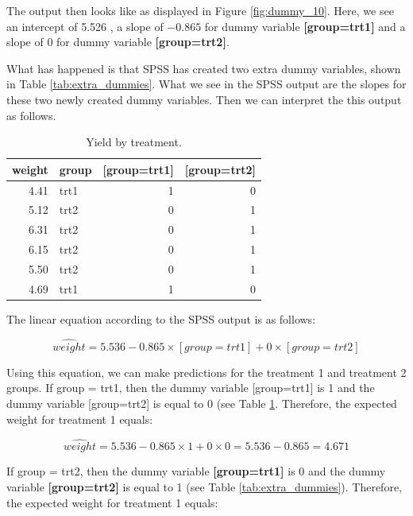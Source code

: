\documentclass[]{book}\usepackage[]{graphicx}\usepackage[]{color}
\begin{document}
The output then looks like as displayed in Figure \ref{fig:dummy_10}. Here, we see an intercept of 5.526 , a slope of $-0.865$ for dummy variable \textbf{[group=trt1]} and a slope of 0 for dummy variable \textbf{[group=trt2]}. 

What has happened is that SPSS has created two extra dummy variables, shown in Table \ref{tab:extra_dummies}. What we see in the SPSS output are the slopes for these two newly created dummy variables. Then we can interpret the this output as follows. 

\begin{table}[ht]
\centering
\caption{Yield by treatment.} 
\label{tab:dummy_9}
\begin{tabular}{rlrr}
  \hline
weight & group & [group=trt1] & [group=trt2] \\ 
  \hline
4.41 & trt1 & 1 & 0 \\ 
  5.12 & trt2 & 0 & 1 \\ 
  6.31 & trt2 & 0 & 1 \\ 
  6.15 & trt2 & 0 & 1 \\ 
  5.50 & trt2 & 0 & 1 \\ 
  4.69 & trt1 & 1 & 0 \\ 
   \hline
\end{tabular}
\end{table}



The linear equation according to the SPSS output is as follows:


\begin{equation}
\widehat{weight} = 5.536 - 0.865 \times [group=trt1]  + 0 \times [group=trt2]  
\end{equation}

Using this equation, we can make predictions for the treatment 1 and treatment 2 groups. If group = trt1, then the dummy variable [group=trt1] is 1 and the dummy variable [group=trt2] is equal to 0 (see Table \ref{tab:dummy_9}. Therefore, the expected weight for treatment 1 equals:

\begin{equation}
\widehat{weight}= 5.536 -0.865 \times 1 + 0 \times 0  = 5.536 - 0.865 = 4.671
\end{equation}

If group = trt2, then the dummy variable \textbf{[group=trt1]} is 0 and the dummy variable \textbf{[group=trt2]} is equal to 1 (see Table \ref{tab:extra_dummies}). Therefore, the expected weight for treatment 1 equals:
\end{document}
